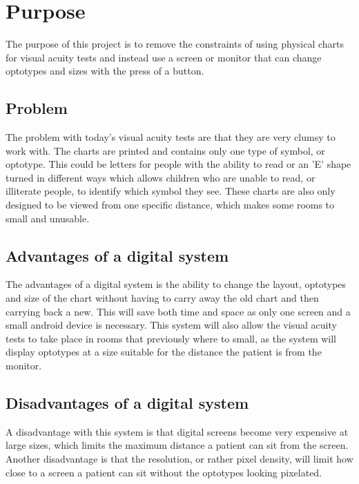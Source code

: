 \documentclass[12pt,a4paper,notitlepage]{report}
\begin{document}
\section{Purpose}
The purpose of this project is to remove the constraints of using physical charts for visual acuity tests and instead use a screen or monitor that can change optotypes and sizes with the press of a button.

\subsection{Problem}
The problem with today's visual acuity tests are that they are very clumsy to work with. The charts are printed and contains only one type of symbol, or optotype. This could be letters for people with the ability to read or an 'E' shape turned in different ways which allows children who are unable to read, or illiterate people, to identify which symbol they see. These charts are also only designed to be viewed from one specific distance, which makes some rooms to small and unusable.

\subsection{Advantages of a digital system}
The advantages of a digital system is the ability to change the layout, optotypes and size of the chart without having to carry away the old chart and then carrying back a new. This will save both time and space as only one screen and a small android device is necessary. This system will also allow the visual acuity tests to take place in rooms that previously where to small, as the system will display optotypes at a size suitable for the distance the patient is from the monitor.

\subsection{Disadvantages of a digital system}
A disadvantage with this system is that digital screens become very expensive at large sizes, which limits the maximum distance a patient can sit from the screen. Another disadvantage is that the resolution, or rather pixel density, will limit how close to a screen a patient can sit without the optotypes looking pixelated.



\end{document}

